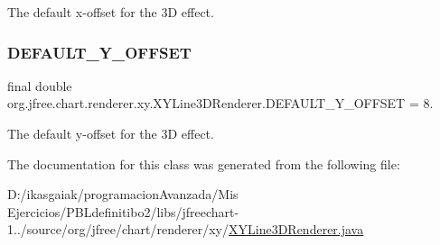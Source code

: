 The default x-\/offset for the 3D effect. \mbox{\label{classorg_1_1jfree_1_1chart_1_1renderer_1_1xy_1_1_x_y_line3_d_renderer_a603734f0f11f69ad5023d8b6409590d4}} 
\subsubsection{\texorpdfstring{D\+E\+F\+A\+U\+L\+T\+\_\+\+Y\+\_\+\+O\+F\+F\+S\+ET}{DEFAULT\_Y\_OFFSET}}
{\footnotesize\ttfamily final double org.\+jfree.\+chart.\+renderer.\+xy.\+X\+Y\+Line3\+D\+Renderer.\+D\+E\+F\+A\+U\+L\+T\+\_\+\+Y\+\_\+\+O\+F\+F\+S\+ET = 8.\hspace{0.3cm}{\ttfamily [static]}}

The default y-\/offset for the 3D effect. 

The documentation for this class was generated from the following file\+:\begin{DoxyCompactItemize}
\item 
D\+:/ikasgaiak/programacion\+Avanzada/\+Mis Ejercicios/\+P\+B\+Ldefinitibo2/libs/jfreechart-\/1../source/org/jfree/chart/renderer/xy/\mbox{\hyperlink{_x_y_line3_d_renderer_8java}{X\+Y\+Line3\+D\+Renderer.\+java}}\end{DoxyCompactItemize}
